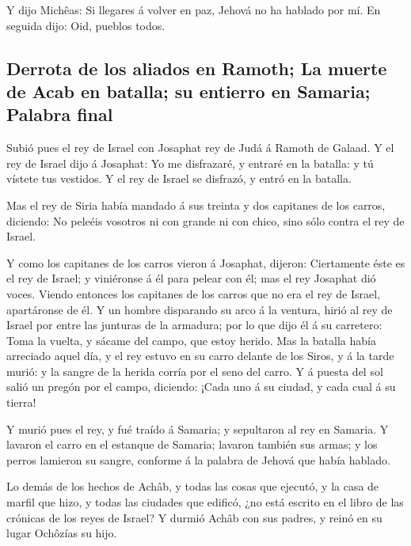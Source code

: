  Y dijo Michêas: Si llegares á volver en paz, Jehová no ha
hablado por mí. En seguida dijo: Oid, pueblos todos.

\hypertarget{derrota-de-los-aliados-en-ramoth-la-muerte-de-acab-en-batalla-su-entierro-en-samaria-palabra-final}{%
\subsection{Derrota de los aliados en Ramoth; La muerte de Acab en
batalla; su entierro en Samaria; Palabra
final}\label{derrota-de-los-aliados-en-ramoth-la-muerte-de-acab-en-batalla-su-entierro-en-samaria-palabra-final}}

 Subió pues el rey de Israel con Josaphat rey de Judá á
Ramoth de Galaad.  Y el rey de Israel dijo á Josaphat: Yo
me disfrazaré, y entraré en la batalla: y tú vístete tus vestidos. Y el
rey de Israel se disfrazó, y entró en la batalla.

 Mas el rey de Siria había mandado á sus treinta y dos
capitanes de los carros, diciendo: No peleéis vosotros ni con grande ni
con chico, sino sólo contra el rey de Israel.

 Y como los capitanes de los carros vieron á Josaphat,
dijeron: Ciertamente éste es el rey de Israel; y viniéronse á él para
pelear con él; mas el rey Josaphat dió voces.  Viendo
entonces los capitanes de los carros que no era el rey de Israel,
apartáronse de él.  Y un hombre disparando su arco á la
ventura, hirió al rey de Israel por entre las junturas de la armadura;
por lo que dijo él á su carretero: Toma la vuelta, y sácame del campo,
que estoy herido.  Mas la batalla había arreciado aquel
día, y el rey estuvo en su carro delante de los Siros, y á la tarde
murió: y la sangre de la herida corría por el seno del carro.
 Y á puesta del sol salió un pregón por el campo, diciendo:
¡Cada uno á su ciudad, y cada cual á su tierra!

 Y murió pues el rey, y fué traído á Samaria; y sepultaron
al rey en Samaria.  Y lavaron el carro en el estanque de
Samaria; lavaron también sus armas; y los perros lamieron su sangre,
conforme á la palabra de Jehová que había hablado.

 Lo demás de los hechos de Achâb, y todas las cosas que
ejecutó, y la casa de marfil que hizo, y todas las ciudades que edificó,
¿no está escrito en el libro de las crónicas de los reyes de Israel?
 Y durmió Achâb con sus padres, y reinó en su lugar
Ochôzías su hijo.

